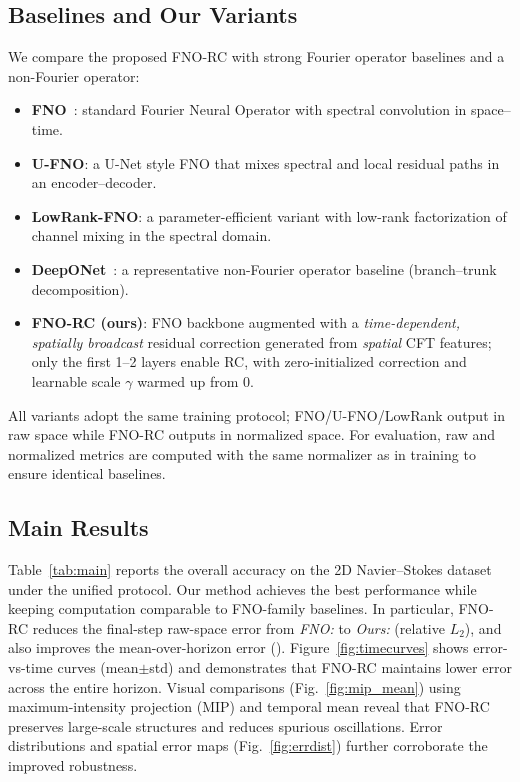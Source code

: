 \subsection*{Baselines and Our Variants}
We compare the proposed FNO-RC with strong Fourier operator baselines and a non-Fourier operator:
\begin{itemize}
  \item \textbf{FNO}~\cite{li2020fourier}: standard Fourier Neural Operator with spectral convolution in space–time.
  \item \textbf{U-FNO}: a U-Net style FNO that mixes spectral and local residual paths in an encoder–decoder.
  \item \textbf{LowRank-FNO}: a parameter-efficient variant with low-rank factorization of channel mixing in the spectral domain.
  \item \textbf{DeepONet}~\cite{lu2021learning}: a representative non-Fourier operator baseline (branch–trunk decomposition).
  \item \textbf{FNO-RC (ours)}: FNO backbone augmented with a \emph{time-dependent, spatially broadcast} residual correction generated from \emph{spatial} CFT features; only the first 1–2 layers enable RC, with zero-initialized correction and learnable scale $\gamma$ warmed up from 0.
\end{itemize}
All variants adopt the same training protocol; FNO/U-FNO/LowRank output in raw space while FNO-RC outputs in normalized space. For evaluation, raw and normalized metrics are computed with the same normalizer as in training to ensure identical baselines.

\subsection*{Main Results}
Table~\ref{tab:main} reports the overall accuracy on the 2D Navier–Stokes dataset under the unified protocol. Our method achieves the best performance while keeping computation comparable to FNO-family baselines. In particular, FNO-RC reduces the final-step raw-space error from \textit{FNO:}  to \textit{Ours:}  (relative $L_2$), and also improves the mean-over-horizon error (). Figure~\ref{fig:timecurves} shows error-vs-time curves (mean$\pm$std) and demonstrates that FNO-RC maintains lower error across the entire horizon. Visual comparisons (Fig.~\ref{fig:mip_mean}) using maximum-intensity projection (MIP) and temporal mean reveal that FNO-RC preserves large-scale structures and reduces spurious oscillations. Error distributions and spatial error maps (Fig.~\ref{fig:errdist}) further corroborate the improved robustness.

